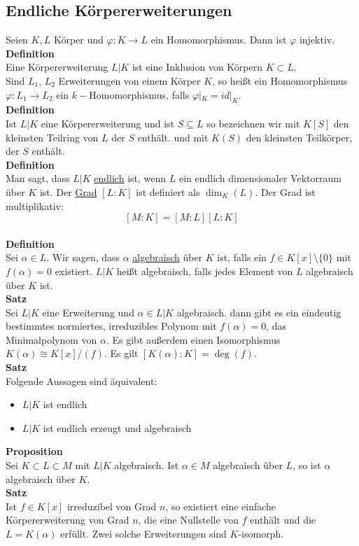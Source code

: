 \documentclass[a4paper, 12pt]{article}
\begin{document}
\subsection{Endliche Körpererweiterungen}
Seien $K,L$ Körper und $\varphi: K \to L$ ein Homomorphismus. Dann ist $\varphi$ injektiv.\\
\textbf{Definition}\\
Eine Körpererweiterung $L | K$ ist eine Inklusion von Körpern $K \subset L$.\\
Sind $L_1$, $L_2$ Erweiterungen von einem Körper $K$, so heißt ein Homomorphismus $\varphi: L_1 \to L_2$ ein $k-$Homomorphismus, falls $\varphi |_K = id |_K$.\\
\textbf{Definition}\\
Ist $L|K$ eine Körpererweiterung und ist $S \subseteq L$ so bezeichnen wir mit $K[S]$ den kleinsten Teilring von $L$ der $S$ enthält. und mit $K(S)$ den kleinsten Teilkörper, der $S$ enthält.\\
\textbf{Definition}\\
Man sagt, dass $L|K$ \underline{endlich} ist, wenn $L$ ein endlich dimensionaler Vektorraum über $K$ ist. Der \underline{Grad} $[L:K]$ ist definiert als $\dim_K(L)$. Der Grad ist multiplikativ: \[[M:K] = [M:L][L:K]\]\\
\textbf{Definition}\\
Sei $\alpha \in L$. Wir sagen, dass $\alpha$ \underline{algebraisch} über $K$ ist, falls ein $f \in K[x]\setminus \{0\}$ mit $f(\alpha) = 0$ existiert. $L|K$ heißt algebraisch, falls jedes Element von $L$ algebraisch über $K$ ist.\\
\textbf{Satz}\\
Sei $L|K$ eine Erweiterung und $\alpha \in L|K$ algebraisch. dann gibt es ein eindeutig bestimmtes normiertes, irreduzibles Polynom mit $f(\alpha) = 0$, das Minimalpolynom von $\alpha$. Es gibt außerdem einen Isomorphismus $K(\alpha) \cong K[x]/(f)$. Es gilt $[K(\alpha):K] = \deg(f)$.\\
\textbf{Satz}\\
Folgende Aussagen sind äquivalent: \begin{itemize}
	\item $L|K$ ist endlich
	\item $L|K$ ist endlich erzeugt und algebraisch
\end{itemize}
\textbf{Proposition}\\
Sei $K\subset L \subset M$ mit $L|K$ algebraisch. Ist $\alpha \in M$ algebraisch über $L$, so ist $\alpha$ algebraisch über $K$.\\
\textbf{Satz}\\
Ist $f \in K[x]$ irreduzibel von Grad $n$, so existiert eine einfache Körpererweiterung von Grad $n$, die eine Nullstelle von $f$ enthält und die $L = K(\alpha)$ erfüllt. Zwei solche Erweiterungen sind $K$-isomorph. 
\end{document}
